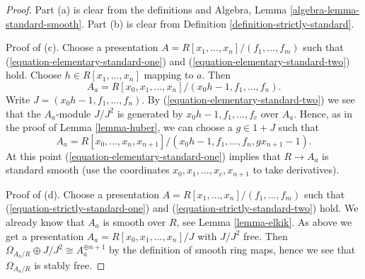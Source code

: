 \begin{proof}
Part (a) is clear from the definitions and
Algebra, Lemma \ref{algebra-lemma-standard-smooth}.
Part (b) is clear from Definition \ref{definition-strictly-standard}.

\medskip\noindent
Proof of (c). Choose a presentation
$A = R[x_1, \ldots, x_n]/(f_1, \ldots, f_m)$ such that
(\ref{equation-elementary-standard-one}) and
(\ref{equation-elementary-standard-two}) hold.
Choose $h \in R[x_1, \ldots, x_n]$ mapping to $a$. Then
$$
A_a = R[x_0, x_1, \ldots, x_n]/(x_0h - 1, f_1, \ldots, f_n).
$$
Write $J = (x_0h - 1, f_1, \ldots, f_n)$.
By (\ref{equation-elementary-standard-two}) we see that the $A_a$-module
$J/J^2$ is generated by $x_0h - 1, f_1, \ldots, f_c$
over $A_a$. Hence, as in the proof of Lemma \ref{lemma-huber},
we can choose a $g \in 1 + J$ such that
$$
A_a = R[x_0, \ldots, x_n, x_{n + 1}]/
(x_0h - 1, f_1, \ldots, f_n, gx_{n + 1} - 1).
$$
At this point (\ref{equation-elementary-standard-one})
implies that $R \to A_a$ is standard smooth (use the coordinates
$x_0, x_1, \ldots, x_c, x_{n + 1}$ to take derivatives).

\medskip\noindent
Proof of (d). Choose a presentation
$A = R[x_1, \ldots, x_n]/(f_1, \ldots, f_m)$ such that
(\ref{equation-strictly-standard-one}) and
(\ref{equation-strictly-standard-two}) hold.
We already know that $A_a$ is smooth over $R$, see
Lemma \ref{lemma-elkik}. As above we get a presentation
$A_a = R[x_0, x_1, \ldots, x_n]/J$ with $J/J^2$ free.
Then $\Omega_{A_a/R} \oplus J/J^2 \cong A_a^{\oplus n + 1}$
by the definition of smooth ring maps, hence we see that $\Omega_{A_a/R}$
is stably free.


\end{proof}
